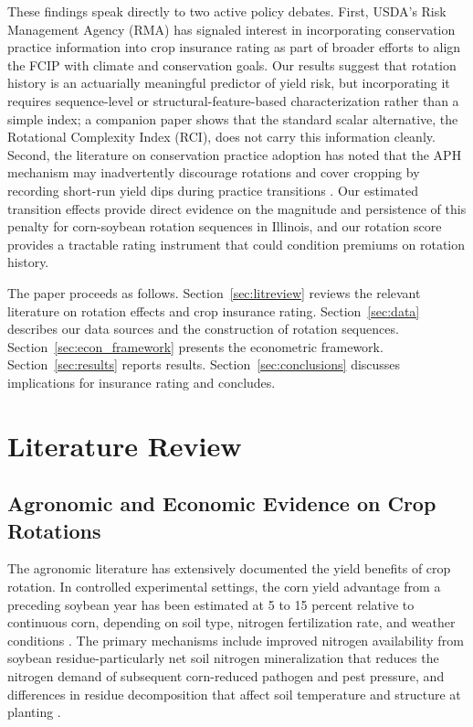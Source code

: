 \documentclass[12pt,letterpaper]{article}
\theoremstyle{remark}
\theoremstyle{remark}
\theoremstyle{plain}
\theoremstyle{definition}
\begin{document}
These findings speak directly to two active policy debates. First, USDA's Risk Management Agency (RMA) has signaled interest in incorporating conservation practice information into crop insurance rating as part of broader efforts to align the FCIP with climate and conservation goals. Our results suggest that rotation history is an actuarially meaningful predictor of yield risk, but incorporating it requires sequence-level or structural-feature-based characterization rather than a simple index; a companion paper shows that the standard scalar alternative, the Rotational Complexity Index (RCI), does not carry this information cleanly. Second, the literature on conservation practice adoption has noted that the APH mechanism may inadvertently discourage rotations and cover cropping by recording short-run yield dips during practice transitions \citep{Connor2022}. Our estimated transition effects provide direct evidence on the magnitude and persistence of this penalty for corn-soybean rotation sequences in Illinois, and our rotation score provides a tractable rating instrument that could condition premiums on rotation history.

The paper proceeds as follows. Section~\ref{sec:litreview} reviews the relevant literature on rotation effects and crop insurance rating. Section~\ref{sec:data} describes our data sources and the construction of rotation sequences. Section~\ref{sec:econ_framework} presents the econometric framework. Section~\ref{sec:results} reports results. Section~\ref{sec:conclusions} discusses implications for insurance rating and concludes.

\section{\label{sec:litreview}Literature Review}
\subsection{\label{subsec:agronomy}Agronomic and Economic Evidence on Crop Rotations}

The agronomic literature has extensively documented the yield benefits of crop rotation. In controlled experimental settings, the corn yield advantage from a preceding soybean year has been estimated at 5 to 15 percent relative to continuous
corn, depending on soil type, nitrogen fertilization rate, and weather conditions \citep{Gentry2013, Farmaha2016}. The primary mechanisms include improved nitrogen availability from soybean residue-particularly net soil nitrogen mineralization that reduces the nitrogen demand of subsequent corn-reduced pathogen and pest pressure, and differences in residue decomposition that affect soil temperature and structure at planting \citep{Gentry2013}.
\end{document}
